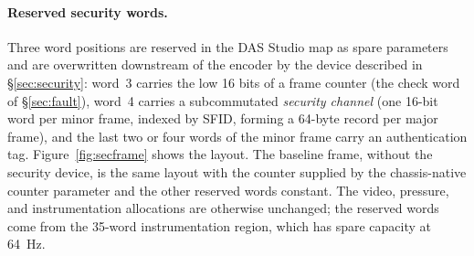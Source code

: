 \documentclass[12pt,letterpaper]{article}
\begin{document}
\paragraph{Reserved security words.}
Three word positions are reserved in the DAS Studio map as spare parameters and are
overwritten downstream of the encoder by the device described in \S\ref{sec:security}:
word~3 carries the low 16 bits of a frame counter (the check word of \S\ref{sec:fault}),
word~4 carries a subcommutated \emph{security channel} (one 16-bit word per minor frame,
indexed by SFID, forming a 64-byte record per major frame), and the last two or four words
of the minor frame carry an authentication tag. Figure~\ref{fig:secframe} shows the layout.
The baseline frame, without the security device, is the same layout with the counter
supplied by the chassis-native counter parameter and the other reserved words constant.
The video, pressure, and instrumentation allocations are otherwise unchanged; the reserved
words come from the 35-word instrumentation region, which has spare capacity at 64~Hz.
\end{document}
